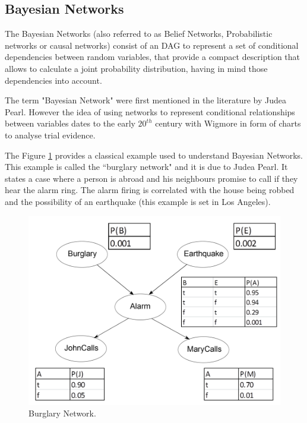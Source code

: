 
\subsection{Bayesian Networks}
\label{subsec:int_BN}

The Bayesian Networks (also referred to as Belief Networks, Probabilistic networks or causal networks) consist of an \ac{DAG} to represent a set of conditional dependencies between random variables, that provide a compact description that allows to calculate a joint probability distribution, having in mind those dependencies into account. 

The term "Bayesian Network" were first mentioned in the literature by Judea Pearl\cite{Pearl1985}. However the idea of using networks to represent conditional relationships between variables dates to the early $20^{th}$ century with Wigmore in form of charts to analyse trial evidence\cite{Kadane1996}. 

The Figure \ref{fig:inference_relationships} provides a classical example used to understand Bayesian Networks. This example is called the ``burglary network" and it is due to Judea Pearl\cite{Pearl1988}\cite{Norvig2003}. It states a case where a person is abroad and his neighbours promise to call if they hear the alarm ring. The alarm firing is correlated with the house being robbed and the possibility of an earthquake (this example is set in Los Angeles). 

\begin{figure}[h]
\centering 

\includegraphics[scale=0.35]{Overview/Figures/BayesianNetworkExample.png}
\caption[Caption for LOF]{Burglary Network. }
\label{fig:inference_relationships}
\end{figure}

